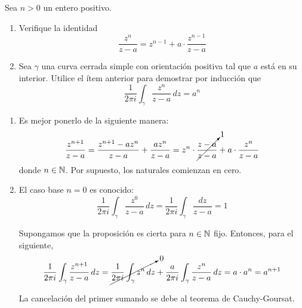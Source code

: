 \begin{exercise}
Sea $n > 0$ un entero positivo.

\begin{enumerate}[label=(\alph*)]
    \item Verifique la identidad
    $$\frac {z^n} {z - a} = z^{n-1} + a \cdot \frac {z^{n-1}} {z - a}$$
    
    \item Sea $\gamma$ una curva cerrada simple con orientación positiva tal que $a$ está en su interior. Utilice el ítem anterior para demostrar por inducción que
    $$\frac 1 {2\pi i} \int_\gamma \frac {z^n} {z - a} \, dz = a^n$$
\end{enumerate}
\end{exercise}

\begin{solution}
\leavevmode
\begin{enumerate}[label=(\alph*)]
    \item Es mejor ponerlo de la siguiente manera:
    $$
    \frac {z^{n+1}} {z - a}
        = \frac {z^{n+1} - az^n} {z - a} + \frac {az^n} {z - a}
        = z^n \cdot \cancelto 1 {\frac {z - a} {z - a}} + a \cdot \frac {z^n} {z - a}
    $$
    donde $n \in \mathbb N$. Por supuesto, los naturales comienzan en cero.
    
    \item El caso base $n = 0$ es conocido:
    $$
    \frac 1 {2\pi i} \int_\gamma \frac {z^0} {z - a} \, dz
        = \frac 1 {2\pi i} \int_\gamma \frac {dz} {z - a}
        = 1
    $$
    
    Supongamos que la proposición es cierta para $n \in \mathbb N$ fijo. Entonces, para el siguiente,
    $$
    \frac 1 {2\pi i} \int_\gamma \frac {z^{n+1}} {z - a} \, dz
        = \cancelto 0 {\frac 1 {2\pi i} \int_\gamma z^n \, dz}
        + \frac a {2\pi i} \int_\gamma \frac {z^n} {z - a} \, dz
        = a \cdot a^n
        = a^{n+1}
    $$
    
    La cancelación del primer sumando se debe al teorema de Cauchy-Goursat.
\end{enumerate}
\end{solution}

\newpage
